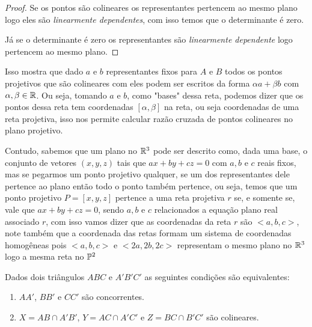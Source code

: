\begin{proof}
Se os pontos são colineares os representantes pertencem ao mesmo plano logo eles são \textit{linearmente dependentes}, com isso temos que o determinante é zero.

Já se o determinante é zero os representantes são \textit{linearmente dependente} logo pertencem ao mesmo plano.
\end{proof}

Isso mostra que dado $a$ e $b$ representantes fixos para $A$ e $B$ todos os pontos projetivos que são colineares com eles podem ser escritos da forma $\alpha a + \beta b$ com $\alpha,\beta \in \mathbb{R}$. Ou seja, tomando $a$ e $b$, como "bases" dessa reta, podemos dizer que os pontos dessa reta tem coordenadas $[\alpha,\beta]$ na reta, ou seja coordenadas de uma reta projetiva, isso nos permite calcular razão cruzada de pontos colineares no plano projetivo.

Contudo, sabemos que um plano no $\mathbb{R}^3$ pode ser descrito como, dada uma base, o conjunto de vetores $(x,y,z)$ tais que $ax+by+cz = 0$ com $a,b$ e $c$ reais fixos, mas se pegarmos um ponto projetivo qualquer, se um dos representantes dele pertence ao plano então todo o ponto também pertence, ou seja, temos que um ponto projetivo $P = [x,y,z]$ pertence a uma reta projetiva $r$ se, e somente se, vale que $ax+by+cz = 0$, sendo $a,b$ e $c$ relacionados a equação plano real associado $r$, com isso vamos dizer que as coordenadas da reta $r$ são $<a,b,c>$, note também que a coordenada das retas formam um sistema de coordenadas homogêneas pois $<a,b,c>$ e $<2a,2b,2c>$ representam o mesmo plano no $\mathbb{R}^3$ logo a mesma reta no $\mathbb{P}^2$

\begin{thm}
Dados dois triângulos $ABC$ e $A'B'C'$ as seguintes condições são equivalentes:
\begin{enumerate}
    \item $AA'$, $BB'$ e $CC'$ são concorrentes.
    \item $X = AB \cap A'B'$, $Y = AC\cap A'C'$ e $Z = BC \cap B'C'$ são colineares.
\end{enumerate}
\end{thm}

